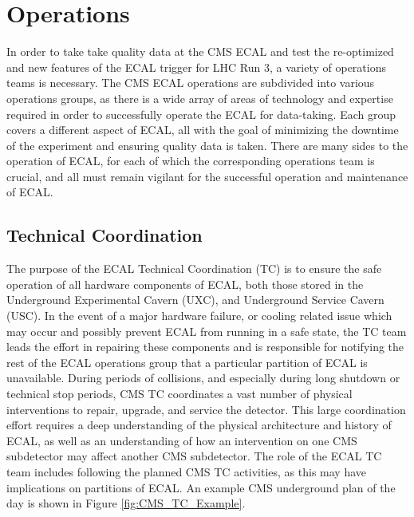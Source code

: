 \section{Operations} \label{sec:ECAL_Operations}

In order to take take quality data at the CMS ECAL and test the re-optimized and new features of the ECAL trigger for LHC Run 3, a variety of operations teams is necessary. The CMS ECAL operations are subdivided into various operations groups, as there is a wide array of areas of technology and expertise required in order to successfully operate the ECAL for data-taking. Each group covers a different aspect of ECAL, all with the goal of minimizing the downtime of the experiment and ensuring quality data is taken. There are many sides to the operation of ECAL, for each of which the corresponding operations team is crucial, and all must remain vigilant for the successful operation and maintenance of ECAL. 

\subsection{Technical Coordination}

The purpose of the ECAL Technical Coordination (TC) is to ensure the safe operation of all hardware components of ECAL, both those stored in the Underground Experimental Cavern (UXC), and Underground Service Cavern (USC). In the event of a major hardware failure, or cooling related issue which may occur and possibly prevent ECAL from running in a safe state, the TC team leads the effort in repairing these components and is responsible for notifying the rest of the ECAL operations group that a particular partition of ECAL is unavailable. During periods of collisions, and especially during long shutdown or technical stop periods, CMS TC coordinates a vast number of physical interventions to repair, upgrade, and service the detector. This large coordination effort requires a deep understanding of the physical architecture and history of ECAL, as well as an understanding of how an intervention on one CMS subdetector may affect another CMS subdetector. The role of the ECAL TC team includes following the planned CMS TC activities, as this may have implications on partitions of ECAL. An example CMS underground plan of the day is shown in Figure \ref{fig:CMS_TC_Example}.

